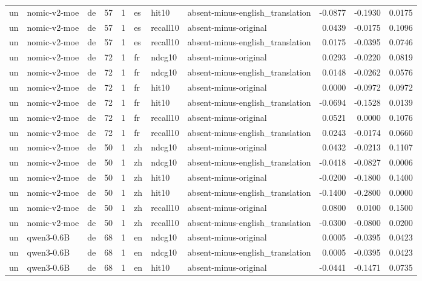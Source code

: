 \begin{tabular}{lllrrlllrrr}
un & nomic-v2-moe & de & 57 & 1 & es & hit10 & absent-minus-english\_translation & -0.0877 & -0.1930 & 0.0175 \\
un & nomic-v2-moe & de & 57 & 1 & es & recall10 & absent-minus-original & 0.0439 & -0.0175 & 0.1096 \\
un & nomic-v2-moe & de & 57 & 1 & es & recall10 & absent-minus-english\_translation & 0.0175 & -0.0395 & 0.0746 \\
un & nomic-v2-moe & de & 72 & 1 & fr & ndcg10 & absent-minus-original & 0.0293 & -0.0220 & 0.0819 \\
un & nomic-v2-moe & de & 72 & 1 & fr & ndcg10 & absent-minus-english\_translation & 0.0148 & -0.0262 & 0.0576 \\
un & nomic-v2-moe & de & 72 & 1 & fr & hit10 & absent-minus-original & 0.0000 & -0.0972 & 0.0972 \\
un & nomic-v2-moe & de & 72 & 1 & fr & hit10 & absent-minus-english\_translation & -0.0694 & -0.1528 & 0.0139 \\
un & nomic-v2-moe & de & 72 & 1 & fr & recall10 & absent-minus-original & 0.0521 & 0.0000 & 0.1076 \\
un & nomic-v2-moe & de & 72 & 1 & fr & recall10 & absent-minus-english\_translation & 0.0243 & -0.0174 & 0.0660 \\
un & nomic-v2-moe & de & 50 & 1 & zh & ndcg10 & absent-minus-original & 0.0432 & -0.0213 & 0.1107 \\
un & nomic-v2-moe & de & 50 & 1 & zh & ndcg10 & absent-minus-english\_translation & -0.0418 & -0.0827 & 0.0006 \\
un & nomic-v2-moe & de & 50 & 1 & zh & hit10 & absent-minus-original & -0.0200 & -0.1800 & 0.1400 \\
un & nomic-v2-moe & de & 50 & 1 & zh & hit10 & absent-minus-english\_translation & -0.1400 & -0.2800 & 0.0000 \\
un & nomic-v2-moe & de & 50 & 1 & zh & recall10 & absent-minus-original & 0.0800 & 0.0100 & 0.1500 \\
un & nomic-v2-moe & de & 50 & 1 & zh & recall10 & absent-minus-english\_translation & -0.0300 & -0.0800 & 0.0200 \\
un & qwen3-0.6B & de & 68 & 1 & en & ndcg10 & absent-minus-original & 0.0005 & -0.0395 & 0.0423 \\
un & qwen3-0.6B & de & 68 & 1 & en & ndcg10 & absent-minus-english\_translation & 0.0005 & -0.0395 & 0.0423 \\
un & qwen3-0.6B & de & 68 & 1 & en & hit10 & absent-minus-original & -0.0441 & -0.1471 & 0.0735 \\

\end{tabular}
